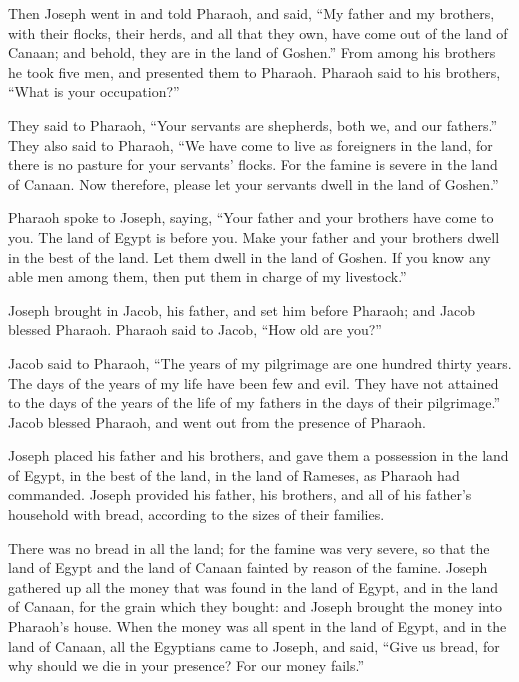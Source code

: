 \mychapter{}
\myverse*{}Then Joseph went in and told Pharaoh, and said, “My father and my brothers, with their flocks, their herds, and all that they own, have come out of the land of Canaan; and behold, they are in the land of Goshen.”  \myverse{}From among his brothers he took five men, and presented them to Pharaoh.  \myverse{}Pharaoh said to his brothers, “What is your occupation?”

They said to Pharaoh, “Your servants are shepherds, both we, and our fathers.”  \myverse{}They also said to Pharaoh, “We have come to live as foreigners in the land, for there is no pasture for your servants’ flocks. For the famine is severe in the land of Canaan. Now therefore, please let your servants dwell in the land of Goshen.”

\myverse{}Pharaoh spoke to Joseph, saying, “Your father and your brothers have come to you.  \myverse{}The land of Egypt is before you. Make your father and your brothers dwell in the best of the land. Let them dwell in the land of Goshen. If you know any able men among them, then put them in charge of my livestock.”

\myverse{}Joseph brought in Jacob, his father, and set him before Pharaoh; and Jacob blessed Pharaoh. \myverse{}Pharaoh said to Jacob, “How old are you?”

\myverse{}Jacob said to Pharaoh, “The years of my pilgrimage are one hundred thirty years. The days of the years of my life have been few and evil. They have not attained to the days of the years of the life of my fathers in the days of their pilgrimage.”  \myverse{}Jacob blessed Pharaoh, and went out from the presence of Pharaoh.

\myverse{}Joseph placed his father and his brothers, and gave them a possession in the land of Egypt, in the best of the land, in the land of Rameses, as Pharaoh had commanded.  \myverse{}Joseph provided his father, his brothers, and all of his father’s household with bread, according to the sizes of their families.

\myverse{}There was no bread in all the land; for the famine was very severe, so that the land of Egypt and the land of Canaan fainted by reason of the famine.  \myverse{}Joseph gathered up all the money that was found in the land of Egypt, and in the land of Canaan, for the grain which they bought: and Joseph brought the money into Pharaoh’s house.  \myverse{}When the money was all spent in the land of Egypt, and in the land of Canaan, all the Egyptians came to Joseph, and said, “Give us bread, for why should we die in your presence? For our money fails.”

